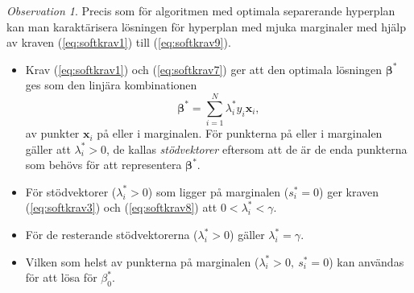 \documentclass[a4paper, 12pt]{report}
\theoremstyle{definition}
\theoremstyle{remark}
\newtheorem*{rem}{Observation}
\newcommand{\bfbeta}{{\boldsymbol{\beta}}}
\begin{document}
\begin{rem}
	Precis som för algoritmen med optimala separerande hyperplan kan man karaktärisera lösningen för hyperplan med mjuka marginaler med hjälp av kraven (\ref{eq:softkrav1}) till (\ref{eq:softkrav9}).
	\begin{itemize}
		\item Krav (\ref{eq:softkrav1}) och (\ref{eq:softkrav7}) ger att den optimala lösningen $\bfbeta^*$ ges som den linjära kombinationen
		\begin{equation*}
			\bfbeta^* = \sum_{i=1}^{N}\lambda_i^*y_i\mathbf{x}_i,
		\end{equation*}
		av punkter $\mathbf{x}_i$ på eller i marginalen. För punkterna på eller i marginalen gäller att $\lambda^*_i>0$, de kallas \emph{stödvektorer} eftersom att de är de enda punkterna som behövs för att representera $\bfbeta^*$.
		\item För stödvektorer ($\lambda^*_i>0$) som ligger på marginalen ($s_i^*=0$) ger kraven (\ref{eq:softkrav3}) och (\ref{eq:softkrav8}) att $0<\lambda_i^*<\gamma$.
		\item För de resterande stödvektorerna ($\lambda_i^*>0$) gäller $\lambda_i^*=\gamma$.
		\item Vilken som helst av punkterna på marginalen ($\lambda^*_i>0,~s^*_i=0$) kan användas för att lösa för $\beta_0^*$.
	\end{itemize}
\end{rem}
\end{document}
